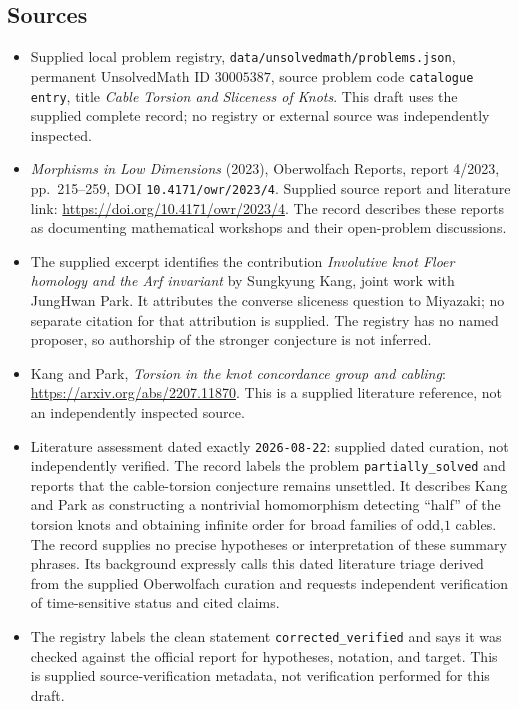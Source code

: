 \documentclass[11pt]{article}
\begin{document}
\subsection{Sources}
\begin{itemize}
\item Supplied local problem registry, \texttt{data/unsolvedmath/problems.json}, permanent UnsolvedMath ID \(30005387\), source problem code \texttt{catalogue entry}, title \emph{Cable Torsion and Sliceness of Knots}. This draft uses the supplied complete record; no registry or external source was independently inspected.
\item \emph{Morphisms in Low Dimensions} (2023), Oberwolfach Reports, report 4/2023, pp.\ 215--259, DOI \texttt{10.4171/owr/2023/4}. Supplied source report and literature link: \url{https://doi.org/10.4171/owr/2023/4}. The record describes these reports as documenting mathematical workshops and their open-problem discussions.
\item The supplied excerpt identifies the contribution \emph{Involutive knot Floer homology and the Arf invariant} by Sungkyung Kang, joint work with JungHwan Park. It attributes the converse sliceness question to Miyazaki; no separate citation for that attribution is supplied. The registry has no named proposer, so authorship of the stronger conjecture is not inferred.
\item Kang and Park, \emph{Torsion in the knot concordance group and cabling}: \url{https://arxiv.org/abs/2207.11870}. This is a supplied literature reference, not an independently inspected source.
\item Literature assessment dated exactly \texttt{2026-08-22}: supplied dated curation, not independently verified. The record labels the problem \texttt{partially\_solved} and reports that the cable-torsion conjecture remains unsettled. It describes Kang and Park as constructing a nontrivial homomorphism detecting ``half'' of the torsion knots and obtaining infinite order for broad families of odd,\(1\) cables. The record supplies no precise hypotheses or interpretation of these summary phrases. Its background expressly calls this dated literature triage derived from the supplied Oberwolfach curation and requests independent verification of time-sensitive status and cited claims.
\item The registry labels the clean statement \texttt{corrected\_verified} and says it was checked against the official report for hypotheses, notation, and target. This is supplied source-verification metadata, not verification performed for this draft.
\end{itemize}
\end{document}
